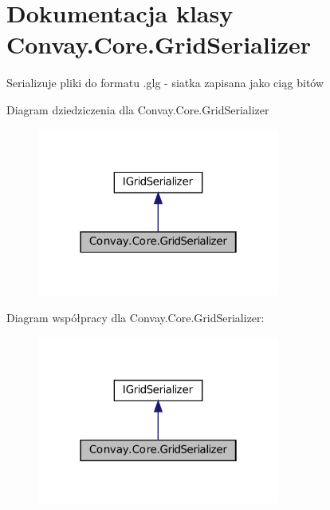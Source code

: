 \hypertarget{class_convay_1_1_core_1_1_grid_serializer}{}\section{Dokumentacja klasy Convay.\+Core.\+Grid\+Serializer}
\label{class_convay_1_1_core_1_1_grid_serializer}


Serializuje pliki do formatu .glg -\/ siatka zapisana jako ciąg bitów  




Diagram dziedziczenia dla Convay.\+Core.\+Grid\+Serializer
\nopagebreak
\begin{figure}[H]
\begin{center}
\leavevmode
\includegraphics[width=226pt]{class_convay_1_1_core_1_1_grid_serializer__inherit__graph}
\end{center}
\end{figure}


Diagram współpracy dla Convay.\+Core.\+Grid\+Serializer\+:
\nopagebreak
\begin{figure}[H]
\begin{center}
\leavevmode
\includegraphics[width=226pt]{class_convay_1_1_core_1_1_grid_serializer__coll__graph}
\end{center}
\end{figure}
